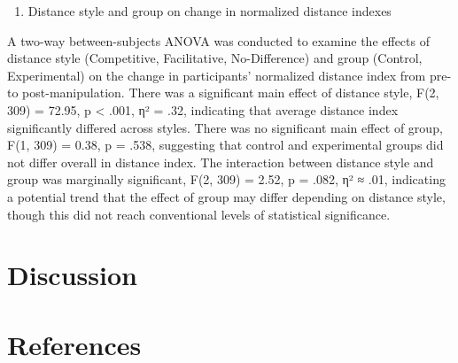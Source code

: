 \documentclass[
  letterpaper,
  DIV=11,
  numbers=noendperiod]{scrartcl}
\providecommand{\tightlist}{%
  \setlength{\itemsep}{0pt}\setlength{\parskip}{0pt}}\usepackage{longtable,booktabs,array}
\begin{document}
\begin{enumerate}
\def\labelenumi{\arabic{enumi}.}
\setcounter{enumi}{7}
\tightlist
\item
  Distance style and group on change in normalized distance indexes
\end{enumerate}

A two-way between-subjects ANOVA was conducted to examine the effects of
distance style (Competitive, Facilitative, No-Difference) and group
(Control, Experimental) on the change in participants' normalized
distance index from pre- to post-manipulation. There was a significant
main effect of distance style, F(2, 309) = 72.95, p \textless{} .001, η²
= .32, indicating that average distance index significantly differed
across styles. There was no significant main effect of group, F(1, 309)
= 0.38, p = .538, suggesting that control and experimental groups did
not differ overall in distance index. The interaction between distance
style and group was marginally significant, F(2, 309) = 2.52, p = .082,
η² ≈ .01, indicating a potential trend that the effect of group may
differ depending on distance style, though this did not reach
conventional levels of statistical significance.

\section{Discussion}\label{discussion}

\section{References}\label{references}
\end{document}
